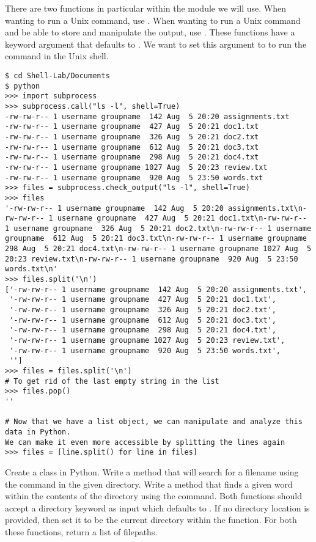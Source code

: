There are two functions in particular within the  module we will use.
When wanting to run a Unix command, use .
When wanting to run a Unix command and be able to store and manipulate the output, use .
These functions have a keyword argument  that defaults to .
We want to set this argument to  to run the command in the Unix shell.

\begin{lstlisting}
$ cd Shell-Lab/Documents
$ python
>>> import subprocess
>>> subprocess.call("ls -l", shell=True)
-rw-rw-r-- 1 username groupname  142 Aug  5 20:20 assignments.txt
-rw-rw-r-- 1 username groupname  427 Aug  5 20:21 doc1.txt
-rw-rw-r-- 1 username groupname  326 Aug  5 20:21 doc2.txt
-rw-rw-r-- 1 username groupname  612 Aug  5 20:21 doc3.txt
-rw-rw-r-- 1 username groupname  298 Aug  5 20:21 doc4.txt
-rw-rw-r-- 1 username groupname 1027 Aug  5 20:23 review.txt
-rw-rw-r-- 1 username groupname  920 Aug  5 23:50 words.txt
>>> files = subprocess.check_output("ls -l", shell=True)
>>> files
'-rw-rw-r-- 1 username groupname  142 Aug  5 20:20 assignments.txt\n-rw-rw-r-- 1 username groupname  427 Aug  5 20:21 doc1.txt\n-rw-rw-r-- 1 username groupname  326 Aug  5 20:21 doc2.txt\n-rw-rw-r-- 1 username groupname  612 Aug  5 20:21 doc3.txt\n-rw-rw-r-- 1 username groupname  298 Aug  5 20:21 doc4.txt\n-rw-rw-r-- 1 username groupname 1027 Aug  5 20:23 review.txt\n-rw-rw-r-- 1 username groupname  920 Aug  5 23:50 words.txt\n'
>>> files.split('\n')
['-rw-rw-r-- 1 username groupname  142 Aug  5 20:20 assignments.txt',
 '-rw-rw-r-- 1 username groupname  427 Aug  5 20:21 doc1.txt',
 '-rw-rw-r-- 1 username groupname  326 Aug  5 20:21 doc2.txt',
 '-rw-rw-r-- 1 username groupname  612 Aug  5 20:21 doc3.txt',
 '-rw-rw-r-- 1 username groupname  298 Aug  5 20:21 doc4.txt',
 '-rw-rw-r-- 1 username groupname 1027 Aug  5 20:23 review.txt',
 '-rw-rw-r-- 1 username groupname  920 Aug  5 23:50 words.txt',
 '']
>>> files = files.split('\n')
# To get rid of the last empty string in the list
>>> files.pop()
''

# Now that we have a list object, we can manipulate and analyze this data in Python.
We can make it even more accessible by splitting the lines again
>>> files = [line.split() for line in files]
\end{lstlisting}

\begin{problem}
Create a  class in Python.
Write a  method that will search for a filename using the  command in the given directory.
Write a  method that finds a given word within the contents of the directory using the  command.
Both functions should accept a directory keyword as input which defaults to .
If no directory location is provided, then set it to be the current directory within the function.
For both these functions, return a list of filepaths.
\end{problem}

